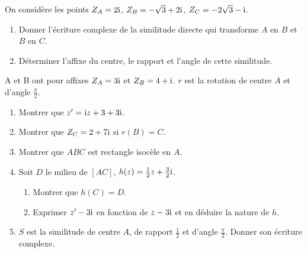 \begin{exercice}
On consid\`ere les points $Z_A = 2\text{i}$, $Z_B = -\sqrt{3} + 2\text{i}$, $Z_C = -2\sqrt{3} - \text{i}$.
\begin{enumerate}
  \item Donner l'\'ecriture complexe de la similitude directe qui transforme $A$ en $B$ et $B$ en $C$.
  \item D\'eterminer l'affixe du centre, le rapport et l'angle de cette similitude.
\end{enumerate}
\end{exercice}

\begin{exercice}
A et B ont pour affixes $Z_A = 3\text{i}$ et $Z_B = 4 + \text{i}$. $r$ est la rotation de centre $A$ et d'angle $\frac{\pi}{2}$.
\begin{enumerate}
  \item Montrer que $z' = \text{i} z + 3 + 3\text{i}$.
  \item Montrer que $Z_C = 2 + 7\text{i}$ si $r(B) = C$.
  \item Montrer que $ABC$ est rectangle isoc\`ele en $A$.
  \item Soit $D$ le milieu de $[AC]$, $h(z) = \frac{1}{2}z + \frac{3}{2}\text{i}$.
    \begin{enumerate}
      \item Montrer que $h(C) = D$.
      \item Exprimer $z' - 3\text{i}$ en fonction de $z - 3\text{i}$ et en d\'eduire la nature de $h$.
    \end{enumerate}
  \item $S$ est la similitude de centre $A$, de rapport $\frac{1}{2}$ et d'angle $\frac{\pi}{2}$. Donner son \'ecriture complexe.
\end{enumerate}
\end{exercice}

